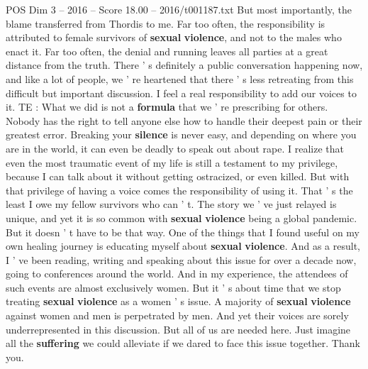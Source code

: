 \begin{textsample}{POS Dim 3 – 2016 – Score 18.00 – 2016/t001187.txt}
But most importantly, the blame transferred from Thordis to me.
Far too often, the responsibility is attributed to female survivors of \textbf{sexual} \textbf{violence}, and not to the males who enact it.
Far too often, the denial and running leaves all parties at a great distance from the truth.
There ' s definitely a public conversation happening now, and like a lot of people, we ' re heartened that there ' s less retreating from this difficult but important discussion.
I feel a real responsibility to add our voices to it.
TE : What we did is not a \textbf{formula} that we ' re prescribing for others.
Nobody has the right to tell anyone else how to handle their deepest pain or their greatest error.
Breaking your \textbf{silence} is never easy, and depending on where you are in the world, it can even be deadly to speak out about rape.
I realize that even the most traumatic event of my life is still a testament to my privilege, because I can talk about it without getting ostracized, or even killed.
But with that privilege of having a voice comes the responsibility of using it.
That ' s the least I owe my fellow survivors who can ' t.
The story we ' ve just relayed is unique, and yet it is so common with \textbf{sexual} \textbf{violence} being a global pandemic.
But it doesn ' t have to be that way.
One of the things that I found useful on my own healing journey is educating myself about \textbf{sexual} \textbf{violence}.
And as a result, I ' ve been reading, writing and speaking about this issue for over a decade now, going to conferences around the world.
And in my experience, the attendees of such events are almost exclusively women.
But it ' s about time that we stop treating \textbf{sexual} \textbf{violence} as a women ' s issue.
A majority of \textbf{sexual} \textbf{violence} against women and men is perpetrated by men.
And yet their voices are sorely underrepresented in this discussion.
But all of us are needed here.
Just imagine all the \textbf{suffering} we could alleviate if we dared to face this issue together.
Thank you.

\end{textsample}

